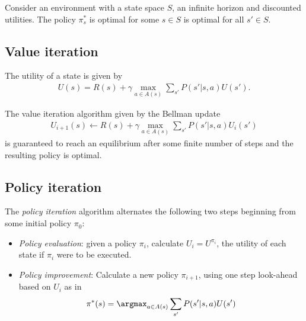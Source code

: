 \documentclass{article}
\begin{document}
\begin{theorem}
	Consider an environment with a state space $S$, an infinite horizon and discounted utilities. The
	policy $\pi_s^*$ is optimal for some $s\in S$ is optimal for all $s'\in S$.
\end{theorem}

\subsection{Value iteration}

\begin{theorem}
	The utility of a state is given by
	\begin{align*}
		U(s) = R(s) + \gamma \max_{a\in A(s)}\sum_{s'} P(s'|s,a)U(s').
	\end{align*}
\end{theorem}

\begin{theorem}
	The value iteration algorithm given by the Bellman update
	\begin{align*}
		U_{i+1}(s) \leftarrow R(s) + \gamma\max_{a\in A(s)} \sum_{s'} P(s'|s,a)U_i(s')
	\end{align*}
	is guaranteed to reach an equilibrium after some finite number of steps
	and the resulting policy is optimal.
\end{theorem}

\subsection{Policy iteration}

\begin{theorem}[R\&N p. 656]
	The \emph{policy iteration} algorithm alternates the following two steps beginning
	from some initial policy $\pi_0$:
	\begin{itemize}
		\item \emph{Policy evaluation}: given a policy $\pi_i$, calculate $U_i=U^{\pi_i}$,
		      the utility of each state if $\pi_i$ were to be executed.
		\item \emph{Policy improvement}: Calculate a new policy $\pi_{i+1}$, using one step
		      look-ahead based on $U_i$ as in
		      \begin{align*}
			      \pi^*(s) = \argmax_{a\in A(s)}\sum_{s'} P(s'|s,a)U(s')
		      \end{align*}
	\end{itemize}
\end{theorem}
\end{document}
